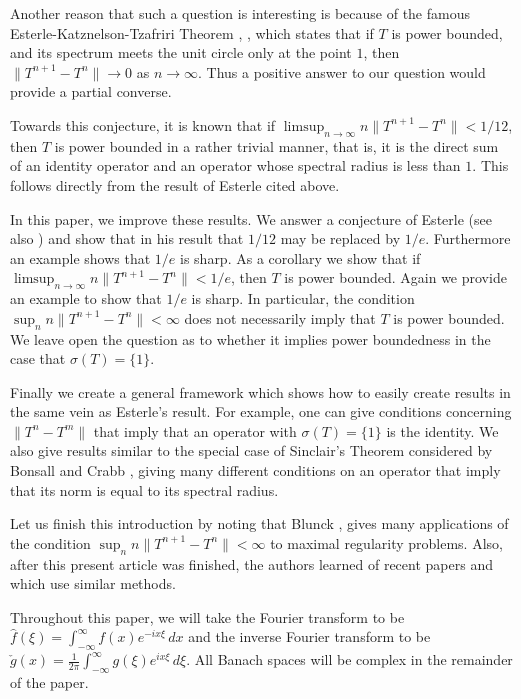 \documentclass[12pt]{amsart}
\newcommand{\snormo}[1]{{\mathopen\|#1\mathclose\|}}
\begin{document}
Another reason that such a question is
interesting is because of the famous Esterle-Katznelson-Tzafriri Theorem
\cite{esterle}, \cite{Ka}, which states that if $T$ is power bounded,
and its spectrum meets the unit circle only at the point $1$, then
$\snormo{T^{n+1}-T^n} \to 0$ as $n \to \infty$.  Thus a positive answer
to our question would provide a partial converse.

Towards this conjecture,
it is known that if $\limsup_{n\to\infty}n\snormo{T^{n+1}-T^n} < 1/12$,
then $T$ is power bounded in a rather trivial manner, that is, it is the
direct sum of an identity operator
and an operator whose spectral radius is less than $1$.
This follows
directly from the result of Esterle cited above.

In this paper, we improve these results.
We answer a conjecture of Esterle \cite{esterle} (see also \cite{berkani})
and show that in his result that $1/12$ may be replaced by $1/e$.
Furthermore an example shows that $1/e$ is sharp.  As a corollary
we show that if $\limsup_{n\to\infty}n\snormo{T^{n+1}-T^n} < 1/e$, then
$T$ is power bounded.  Again we provide an example to show that $1/e$ is
sharp.
In particular, the
condition $\sup_n n\snormo{T^{n+1}-T^n} < \infty$ does not necessarily imply
that $T$ is power bounded.
We leave open the question as to whether it
implies power boundedness in the case that $\sigma(T) = \{1\}$.

Finally we create a general framework which shows how to
easily create results in the same vein as Esterle's result.
For example, one can give conditions concerning $\snormo{T^n-T^m}$
that imply that an operator with $\sigma(T)=\{1\}$ is the identity.
We also give results similar to the special case of Sinclair's
Theorem \cite{sinclair} considered by Bonsall and Crabb \cite{bonsall-crabb},
giving many different
conditions on an operator that imply that its norm is equal
to its spectral radius.

Let us finish this introduction by noting that Blunck \cite{blunck1},
\cite{blunck2} gives
many applications of
the condition $\sup_n n \snormo{T^{n+1}-T^n} < \infty$
to maximal regularity problems.
Also, after this present article was finished, the authors learned of
recent papers \cite{berkani-esterle-mokhtari} and \cite{esterle-mokhtari}
which use similar methods.

Throughout this paper, we will
take the Fourier transform to be
$\hat f(\xi) = \int_{-\infty}^\infty f(x) e^{-i x \xi} \, dx$
and the inverse Fourier transform to be
$\check g(x) = \frac1{2\pi} \int_{-\infty}^\infty g(\xi) e^{i x \xi} \, d\xi$.
All Banach spaces will be complex in the remainder of the paper.
\end{document}
